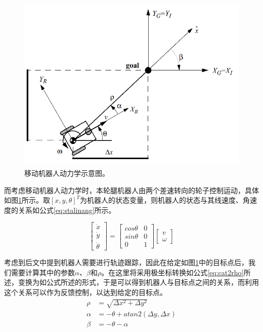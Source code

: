 \begin{figure}[h!]
  \centering
  \includegraphics[width=0.6\linewidth]{figures/Sec4/kingoal.png}
  \caption{
  移动机器人动力学示意图\cite{siegwart2011introduction}。
  }
  \label{fig:sec4-kingoal}
   \vspace{6pt}
\end{figure}

而考虑移动机器人动力学时，本轮腿机器人由两个差速转向的轮子控制运动，具体如图\ref{fig:sec4-kingoal}所示。取$[x,y,\theta]^T$为机器人的状态变量，则机器人的状态与其线速度、角速度的关系如公式\ref{eq:stalinang}所示。

\begin{equation}
    \begin{bmatrix}
        \dot{x} \\ \dot{y} \\ \dot{\theta}
    \end{bmatrix} = 
    \begin{bmatrix}
        cos \theta & 0 \\ sin \theta & 0 \\ 0 & 1
    \end{bmatrix}
    \begin{bmatrix}
        v \\ \omega
    \end{bmatrix}
    \label{eq:stalinang}
\end{equation}

考虑到后文中提到机器人需要进行轨迹跟踪，因此在给定如图\ref{fig:sec4-kingoal}中的目标点后，我们需要计算其中的参数$\alpha$、$\beta$和$\rho$。在这里将采用极坐标转换如公式\ref{eq:cat2rho}所述，变换为如公式所述的形式，于是可以得到机器人与目标点之间的关系，而利用这个关系可以作为反馈控制，以达到给定的目标点。
\begin{equation}
    \begin{aligned}
      \rho & = \sqrt{\Delta x^2 + \Delta y^2} \\
      \alpha & = -\theta + atan2(\Delta y, \Delta x) \\
      \beta & = -\theta -\alpha 
    \end{aligned}
    \label{eq:cat2rho}
\end{equation}


